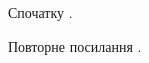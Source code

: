 \documentclass{article}
\begin{document}
Спочатку \cite{third,first}.

Повторне посилання \cite{third}.


\end{document}
